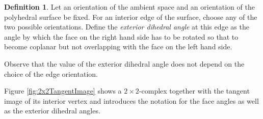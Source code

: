 \documentclass{amsart}
\theoremstyle{definition}
\newtheorem{dfn}[thm]{Definition}
\begin{document}
\begin{dfn}
Let an orientation of the ambient space and an orientation of the polyhedral surface be fixed.
For an interior edge of the surface, choose any of the two possible orientations.
Define the \emph{exterior dihedral angle} at this edge as the angle by which the face on the right hand side has to be rotated so that to become coplanar but not overlapping with the face on the left hand side.
\end{dfn}
Observe that the value of the exterior dihedral angle does not depend on the choice of the edge orientation.

Figure \ref{fig:2x2TangentImage} shows a $2 \times 2$-complex together with the tangent image of its interior vertex and introduces the notation for the face angles as well as the exterior dihedral angles.
\end{document}
